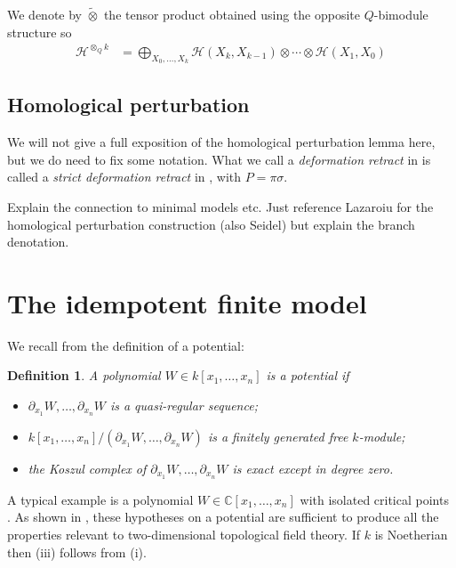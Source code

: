 \documentclass[english,letter paper,12pt,leqno]{article}
\theoremstyle{example}
\newtheorem{definition}[theorem]{Definition}
\numberwithin{equation}{section}
\def\HH{\HH}
\def\HH{\mathcal{H}}
\begin{document}
We denote by $\widetilde{\otimes}$ the tensor product obtained using the opposite $Q$-bimodule structure so
\begin{align*}
\HH^{\otimes_Q k} &= \bigoplus_{X_0,\ldots,X_k} \HH(X_k,X_{k-1}) \otimes \cdots \otimes \HH(X_1,X_0)
\end{align*}

\subsection{Homological perturbation}

We will not give a full exposition of the homological perturbation lemma here, but we do need to fix some notation. What we call a \emph{deformation retract} in \cite{cut} is called a \emph{strict deformation retract} in \cite[\S 3.3]{lazaroiu}, with $P = \pi \sigma$.

Explain the connection to minimal models etc. Just reference Lazaroiu for the homological perturbation construction (also Seidel) but explain the branch denotation.

\section{The idempotent finite model}\label{section:the_model}

We recall from \cite{lgdual} the definition of a potential:

\begin{definition}\label{defn:potential} A polynomial $W \in k[x_1,\ldots,x_n]$ is a \textsl{potential} if
\begin{itemize}
\item[(i)] $\partial_{x_1} W,\ldots,\partial_{x_n} W$ is a quasi-regular sequence;
\item[(ii)] $k[x_1,\ldots,x_n]/(\partial_{x_1} W,\ldots,\partial_{x_n} W)$ is a finitely generated free $k$-module;
\item[(iii)] the Koszul complex of $\partial_{x_1} W,\ldots,\partial_{x_n} W$ is exact except in degree zero.
\end{itemize}
\end{definition}

A typical example is a polynomial $W \in \mathbb{C}[x_1,\ldots,x_n]$ with isolated critical points \cite[Example 2.5]{lgdual}. As shown in \cite{lgdual}, these hypotheses on a potential are sufficient to produce all the properties relevant to two-dimensional topological field theory. If $k$ is Noetherian then (iii) follows from (i).
\end{document}
